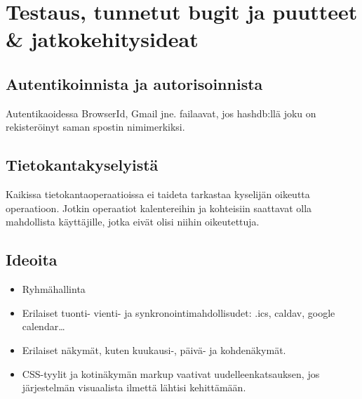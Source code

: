 \documentclass[a4paper,12pt]{report}
\begin{document}
\chapter{Testaus, tunnetut bugit ja puutteet \& jatkokehitysideat}

\section*{Autentikoinnista ja autorisoinnista}
Autentikaoidessa BrowserId, Gmail jne. failaavat, jos hashdb:llä joku on
rekisteröinyt saman spostin nimimerkiksi.

\section*{Tietokantakyselyistä}
Kaikissa tietokantaoperaatioissa ei taideta tarkastaa kyselijän oikeutta
operaatioon. Jotkin operaatiot kalentereihin ja kohteisiin saattavat olla
mahdollista käyttäjille, jotka eivät olisi niihin oikeutettuja.

\section*{Ideoita}
\begin{itemize}
      \item Ryhmähallinta
      \item Erilaiset tuonti- vienti- ja synkronointimahdollisudet: .ics,
         caldav, google calendar\dots
      \item Erilaiset näkymät, kuten kuukausi-, päivä- ja kohdenäkymät.
      \item CSS-tyylit ja kotinäkymän markup vaativat uudelleenkatsauksen,
         jos järjestelmän visuaalista ilmettä lähtisi kehittämään.
\end{itemize}


\end{document}
